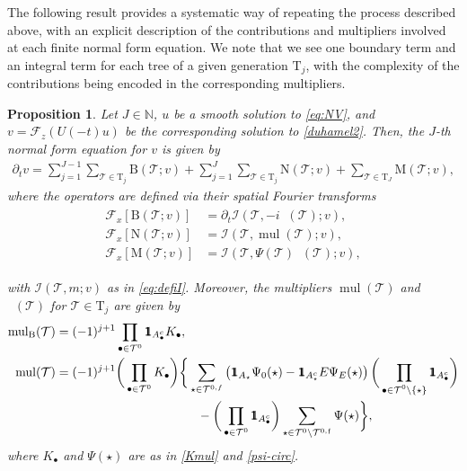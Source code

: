\documentclass[a4paper,
11pt,  reqno]{amsart}
\newcommand{\mathbbm}[1]{\mathchoice%
    {\hbox{\sffamily 1\kern-.40em 1}}%
    {\hbox{\sffamily 1\kern-.40em 1}}%
    {\hbox{\scriptsize\sffamily 1\kern-.30em 1}}%
    {\hbox{\tiny\sffamily 1\kern-.25em 1}}}%
\newcommand{\5}{\textup{V}}
\newcommand{\noi}{\noindent}
\newcommand{\ind}{\mathbbm 1}
\newcommand{\F}{\mathcal{F}}
\newcommand{\dt}{\partial_t}
\newtheorem{proposition}[theorem]{Proposition}
\theoremstyle{remark}
\newcommand{\bul}{\bullet}
\newcommand{\TT}{\mathcal{T}}
\newcommand{\Tr}{\mathrm{T}}
\newcommand{\Ft}{{\mathcal{F}}}
\newcommand{\ff}{\mathfrak{f}}
\newcommand{\N}{\mathbb{N}}
\DeclareMathOperator{\mul}{mul}
\DeclareMathOperator{\mulB}{mul_{\BB}}
\newcommand{\Ical}{\mathcal{I}}
\numberwithin{equation}{section}
\numberwithin{theorem}{section}
\newcommand{\MM}{\mathrm{M}}
\newcommand{\NN}{\mathrm{N}}
\newcommand{\BB}{\mathrm{B}}
\begin{document}
The following result provides a systematic way of repeating the process described above, with an explicit description of the contributions and multipliers involved at each finite normal form equation. 
We note that we see one boundary term and an integral term for each tree of a given generation $\Tr_j$, with the complexity of the contributions being encoded in the corresponding multipliers.








\begin{proposition}
\label{PRO:NFE}
Let $J\in\N$, $u$ be a smooth solution to \eqref{eq:NV}, and $v=\F_z(U(-t)u)$ be the corresponding solution to \eqref{duhamel2}.
Then, 
the $J$-th normal form equation for $v$ is given by
\begin{align}
\label{NFE1}
\dt v=
\sum_{j=1}^{J-1} \sum_{\TT\in \Tr_j} \BB(\TT; v) 
+ \sum_{j=1}^{J} \sum_{\TT\in \Tr_j} \NN(\TT; v) 
+ \sum_{\TT\in \Tr_{J}}
\MM(\TT; v),
\end{align}
where the operators are defined via their spatial Fourier transforms
\begin{align}
\label{NFE1a}
\begin{split}
\Ft_x [\BB(\TT;v)]  & = \dt\Ical(\TT, - i \mulB(\TT); v),\\
\Ft_x [\NN(\TT;v)]  & = \Ical(\TT, \mul(\TT) ; v  ), \\
\Ft_x [\MM(\TT;v)] & = \Ical(\TT, \Psi(\TT)\mulB(\TT); v),
\end{split}
\end{align}

\noi
with $\Ical(\TT, m; v)$ as in \eqref{eq:defiI}.
Moreover,
the multipliers $\mul(\TT)$ and $\mulB(\TT)$ for $\TT\in \Tr_j$ are given by
\begin{align}
\label{NFE0b}
\begin{split}
\mulB(\TT)
& =  (-1)^{j+1}  \prod_{\bul \in \TT^0}  \ind_{A^c_{\bul}} K_\bul
,
\\
\mul(\TT) & =  (-1)^{j+1} \bigg(\prod_{\bul \in \TT^0} K_\bul \bigg) \bigg\{  \sum_{\star \in \TT^{0,f}}
\left(\ind_{A_{\star}} \Psi_0(\star) - \ind_{A_{\star}^c} E\Psi_E(\star)\right)\bigg(\prod_{\substack{\bul \in \TT^0 \setminus\{\star\}
}} \ind_{A^c_{\bul}} \bigg)\\
&
\hspace{4cm}
-
\bigg( \prod_{\bul \in \TT^0} \ind_{A_\bul^c} \bigg)
\sum_{\star\in \TT^0 \setminus \TT^{0,\ff}} \Psi(\star)
 \bigg\},
\end{split}
\end{align}
where $K_\bul$ and $\Psi(\star)$ are as in \eqref{Kmul} and \eqref{psi-circ}. 

\end{proposition}
\end{document}
